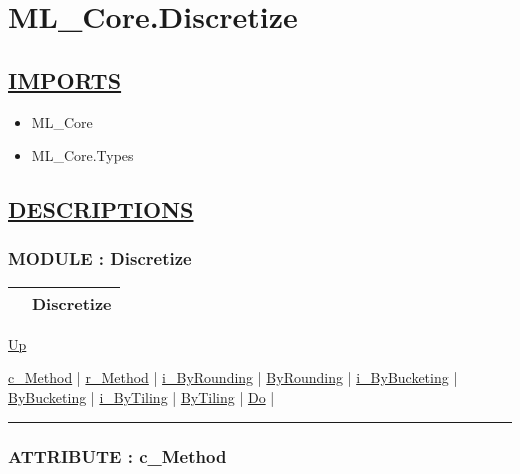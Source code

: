 \chapter*{ML\_Core.Discretize}
\hypertarget{ecldoc:toc:ML_Core.Discretize}{}

\section*{\underline{IMPORTS}}
\begin{itemize}
\item ML\_Core
\item ML\_Core.Types
\end{itemize}

\section*{\underline{DESCRIPTIONS}}
\subsection*{MODULE : Discretize}
\hypertarget{ecldoc:ML_Core.Discretize}{}

{\renewcommand{\arraystretch}{1.5}
\begin{tabularx}{\textwidth}{|>{\raggedright\arraybackslash}l|X|}
\hline
\hspace{0pt} & Discretize \\
\hline
\end{tabularx}
}

\hyperlink{ecldoc:toc:ML_Core}{Up}

\par


\hyperlink{ecldoc:ecldoc-c_Method}{c\_Method}  |
\hyperlink{ecldoc:ml_core.discretize.r_method}{r\_Method}  |
\hyperlink{ecldoc:ml_core.discretize.i_byrounding}{i\_ByRounding}  |
\hyperlink{ecldoc:ml_core.discretize.byrounding}{ByRounding}  |
\hyperlink{ecldoc:ml_core.discretize.i_bybucketing}{i\_ByBucketing}  |
\hyperlink{ecldoc:ml_core.discretize.bybucketing}{ByBucketing}  |
\hyperlink{ecldoc:ml_core.discretize.i_bytiling}{i\_ByTiling}  |
\hyperlink{ecldoc:ml_core.discretize.bytiling}{ByTiling}  |
\hyperlink{ecldoc:ml_core.discretize.do}{Do}  |

\rule{\textwidth}{0.4pt}

\subsection*{ATTRIBUTE : c\_Method}
\hypertarget{ecldoc:ecldoc-c_Method}{}

